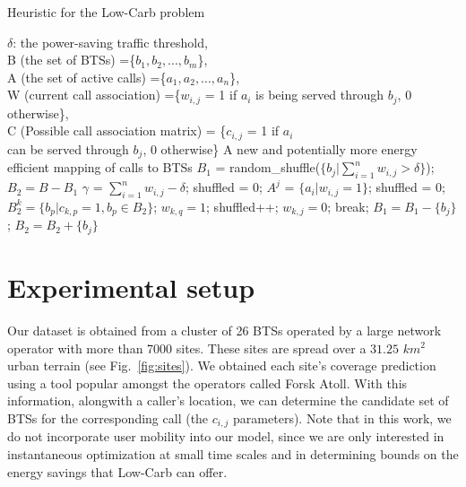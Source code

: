 \begin{algorithm}
\caption{Heuristic for the Low-Carb problem}
\label{algo:heur1}
\begin{algorithmic}[1]
\REQUIRE $\delta$: the power-saving traffic threshold,\\B (the set of BTSs) =\{$b_1, b_2, ..., b_m$\},\\A (the set of active calls) =\{$a_1, a_2, ..., a_n$\},\\W (current call association) =\{$w_{i,j}$ = 1 if $a_i$ is being served through $b_j$, 0 otherwise\},\\C (Possible call association matrix) = \{$c_{i,j}$ = 1 if $a_i$ \\can be served through $b_j$, 0 otherwise\}
\ENSURE A new and potentially more energy efficient mapping of calls to BTSs
\STATE $B_1$ = random\_shuffle($\{b_j | \sum\limits_{i=1}^{n}w_{i,j}>\delta\}$); 
\STATE $B_2=B - B_1$
	\STATE $\gamma$ = $\sum\limits_{i=1}^{n}w_{i,j} - \delta$; \quad shuffled = 0;
	\STATE $A^j$ = $\{a_i | w_{i,j}=1\}$; \quad shuffled = 0;
			\STATE $B_2^k = \{b_p | c_{k,p}=1, b_p \in B_2\}$;
					\STATE $w_{k,q} = 1$; \quad shuffled++;
					\STATE $w_{k,j} = 0$; \quad break;
				\ENDIF
			\ENDFOR
		\ENDIF
	\ENDFOR
\STATE $B_1 = B_1 - \{b_j\}$; \quad $B_2 = B_2 + \{b_j\}$
\ENDIF
\ENDFOR
\end{algorithmic}
\end{algorithm}

\section{Experimental setup} 
\label{sec:case2:experiments} Our dataset is obtained from a cluster of 26 BTSs operated by a large network operator with more than 7000 sites. These sites are spread over a $31.25$ $km^2$ urban terrain (see Fig.~\ref{fig:sites}). We obtained each site's coverage prediction using a tool popular amongst the operators called Forsk Atoll. With this information, alongwith a caller's location, we can determine the candidate set of BTSs for the corresponding call (the $c_{i,j}$ parameters). Note that in this work, we do not incorporate user mobility into our model, since we are only interested in instantaneous optimization at small time scales and in determining bounds on the energy savings that Low-Carb can offer.

